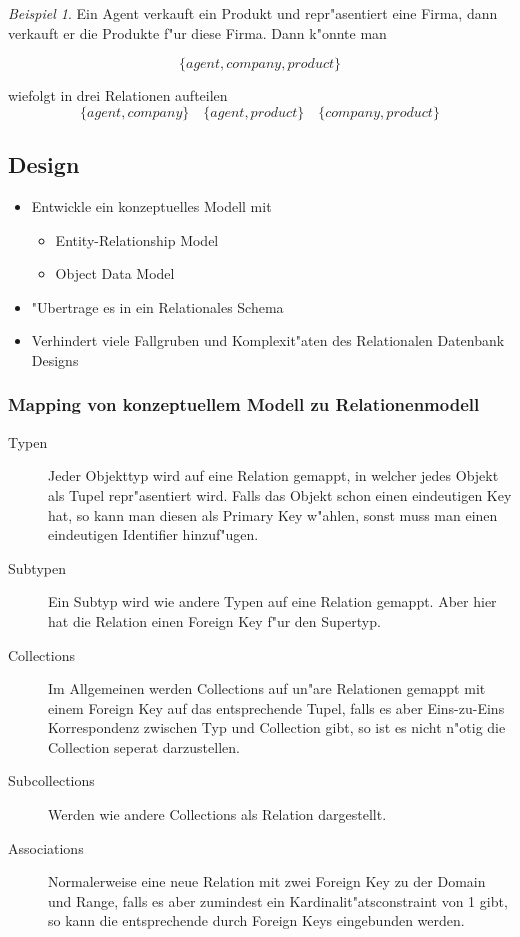 \documentclass[german, 10pt, a4paper, twocolumn]{scrartcl}
\theoremstyle{definition}
\theoremstyle{remark}
\theoremstyle{example}
\newtheorem{example}{Beispiel}[subsection]
\begin{document}
\begin{example} Ein Agent verkauft ein Produkt und repr"asentiert eine Firma, dann verkauft er die Produkte f"ur diese Firma. Dann k"onnte man 

\begin{displaymath}
	\{ agent, company, product \}
\end{displaymath}

wiefolgt in drei Relationen aufteilen
\begin{displaymath}
	\{ agent, company \} \quad \{agent, product\} \quad \{company, product\}
\end{displaymath}
\end{example}

\subsection{Design}

\begin{itemize}
	\item Entwickle ein konzeptuelles Modell mit
		\begin{itemize}
			\item Entity-Relationship Model
			\item Object Data Model
		\end{itemize}
	\item "Ubertrage es in ein Relationales Schema
	\item Verhindert viele Fallgruben und Komplexit"aten des Relationalen Datenbank Designs
\end{itemize}

\subsubsection{Mapping von konzeptuellem Modell zu Relationenmodell}

\begin{description}
	\item[Typen] Jeder Objekttyp wird auf eine Relation gemappt, in welcher jedes Objekt als Tupel repr"asentiert wird. Falls das Objekt schon einen eindeutigen Key hat, so kann man diesen als Primary Key w"ahlen, sonst muss man einen eindeutigen Identifier hinzuf"ugen.
	\item[Subtypen] Ein Subtyp wird wie andere Typen auf eine Relation gemappt. Aber hier hat die Relation einen Foreign Key f"ur den Supertyp.
	\item[Collections] Im Allgemeinen werden Collections auf un"are Relationen gemappt mit einem Foreign Key auf das entsprechende Tupel, falls es aber Eins-zu-Eins Korrespondenz zwischen Typ und Collection gibt, so ist es nicht n"otig die Collection seperat darzustellen.
	\item[Subcollections] Werden wie andere Collections als Relation dargestellt.
	\item[Associations] Normalerweise eine neue Relation mit zwei Foreign Key zu der Domain und Range, falls es aber zumindest ein Kardinalit"atsconstraint von 1 gibt, so kann die entsprechende durch Foreign Keys eingebunden werden.
\end{description}
\end{document}
